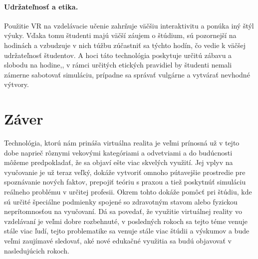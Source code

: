 \documentclass[10pt,twoside,slovak,a4paper]{article}
\begin{document}
 \paragraph{Udržateľnosť a etika.}
Použitie VR na vzdelávacie učenie zahrňuje väčšiu interaktivitu a ponúka iný štýl výuky. Vďaka tomu študenti majú väčší záujem o štúdium, sú pozornejší na hodinách a vzbudzuje v nich túžbu zúčastniť sa týchto hodín, čo vedie k väčšej udržateľnosť študentov. A hoci táto technológia poskytuje určitú zábavu a slobodu na hodine,, v rámci určitých etických pravidiel by študenti nemali zámerne sabotovať simuláciu, prípadne sa správať vulgárne a vytvárať nevhodné výtvory.

\section{Záver} \label{zaver} 
Technológia, ktorú nám prináša virtuálna realita je veľmi prínosná už v tejto dobe naprieč rôznymi vekovými kategóriami a odvetviami a do budúcnosti môžeme predpokladať, že sa objaví ešte viac skvelých využití. Jej vplyv na vyučovanie je už teraz veľký, dokáže vytvoriť omnoho pútavejšie prostredie pre spoznávanie nových faktov, prepojiť teóriu s praxou a tiež poskytnúť simuláciu reálneho problému v určitej profesii. Okrem tohto dokáže pomôcť pri štúdiu, kde sú určité špeciálne podmienky spojené so zdravotným stavom alebo fyzickou neprítomnosťou na vyučovaní. Dá sa povedať, že využitie virtuálnej reality vo vzdelávaní je veľmi dobre rozbehnuté, v posledných rokoch sa tejto téme venuje stále viac ľudí, tejto problematike sa venuje stále viac štúdii a výskumov a bude veľmi zaujímavé sledovať, aké nové edukačné využitia sa budú objavovať v nasledujúcich rokoch. 







\end{document}
